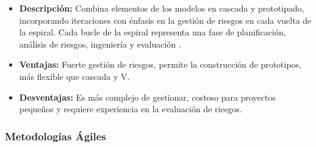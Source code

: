 \begin{enumerate}
    \begin{itemize}
        \item \textbf{Descripción:} Combina elementos de los modelos en cascada y prototipado, incorporando iteraciones con énfasis en la gestión de riesgos en cada vuelta de la espiral. Cada bucle de la espiral representa una fase de planificación, análisis de riesgos, ingeniería y evaluación \cite{studocu2024tradicionales}.
        \item \textbf{Ventajas:} Fuerte gestión de riesgos, permite la construcción de prototipos, más flexible que cascada y V.
        \item \textbf{Desventajas:} Es más complejo de gestionar, costoso para proyectos pequeños y requiere experiencia en la evaluación de riesgos.
    \end{itemize}
    
\end{enumerate}

\subsubsection{Metodologías Ágiles}

